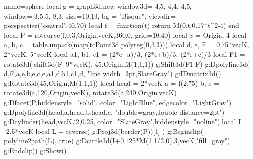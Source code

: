 \documentclass[border=5pt]{standalone}
\begin{document}
\begin{luadraw}{name=sphere}
    local g = graph3d:new{
        window3d={-4,5,-4,4,-4,5},
        window={-3,5.5,-8,3},
        size={10,10}, bg = "Bisque",
        viewdir= perspective("central",40,70)
    }
    local f = function(t) return M(0,t,0.17*t^2-4) end
    local P = rotcurve(f,0,3,{Origin,vecK},360,0, {grid={10,40}})
    local S = {Origin, 4}
    local a, b, c = table.unpack(map(toPoint3d,polyreg(0,3,3)))
    local d, e, F = 0.75*vecK, 2*vecK, 5*vecK
    local a1, b1, c1 = (2*e+a)/3, (2*e+b)/3, (2*e+c)/3
    local F1 = rotate3d( shift3d(F,-9*vecK), 45,{Origin,M(1,1,1)})
    g:Shift3d(F1-F)
    g:Dpolyline3d( {{d,F},{a,e},{b,e},{c,e},{a1,d,b1},{c1,d}}, "line width=3pt,SlateGray")
    g:IDmatrix3d()
    g:Rotate3d(45,{Origin,M(1,1,1)})
    local head = 2*vecK
    a = f(2.75)
    b, c = rotate3d(a,120,{Origin,vecK}), rotate3d(a,240,{Origin,vecK})
    g:Dfacet(P,{hiddenstyle="solid", color="LightBlue", edgecolor="LightGray"})
    g:Dpolyline3d({{head,a},{head,b},{head,c}}, "double=gray,double distance=2pt")
    g:Dcylinder(head,vecK/2,0.25, {color="SlateGray",hiddenstyle="noline"})
    local I = -2.5*vecK
    local L = reverse( g:Proj3d(border(P))[1] )
    g:Beginclip( polyline2path(L), true)
        g:Dcircle3d(I+0.125*M(1,1/2,0),3,vecK,"fill=gray")
    g:Endclip()
    g:Show()
\end{luadraw}
\end{document}
